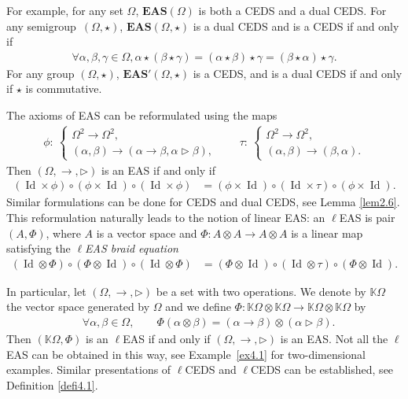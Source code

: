 \documentclass[pdftex]{sigma}
\numberwithin{equation}{section}
\newcommand{\eas}{\mathbf{EAS}}
\begin{document}
For example, for any set $\Omega$, $\eas(\Omega)$ is both a CEDS and a dual CEDS. For any semigroup~$(\Omega,\star)$, $\eas(\Omega,\star)$ is a dual CEDS and is a CEDS if and only if
\begin{align*}
\forall \alpha,\beta,\gamma \in \Omega,\alpha \star (\beta \star \gamma)=(\alpha \star \beta) \star \gamma=(\beta \star \alpha) \star \gamma.
\end{align*}
For any group $(\Omega,\star)$, $\eas'(\Omega,\star)$ is a CEDS, and is a dual CEDS if and only if $\star$ is commutative.

The axioms of EAS can be reformulated using the maps
\begin{gather*}
\phi\colon\ \begin{cases}
\Omega^2\longrightarrow\Omega^2,\\
(\alpha,\beta)\longrightarrow(\alpha \rightarrow \beta,\alpha \triangleright \beta),
\end{cases}\qquad
\tau\colon\ \begin{cases}
\Omega^2\longrightarrow\Omega^2,\\
(\alpha,\beta)\longrightarrow(\beta,\alpha).
\end{cases}
\end{gather*}
Then $(\Omega,\rightarrow,\triangleright)$ is an EAS if and only if
\begin{align*}
(\operatorname{Id} \times \phi)\circ (\phi\times \operatorname{Id})\circ (\operatorname{Id} \times \phi)&=(\phi \times \operatorname{Id})\circ (\operatorname{Id} \times \tau)\circ (\phi\times \operatorname{Id}).
\end{align*}
Similar formulations can be done for CEDS and dual CEDS, see Lemma \ref{lem2.6}.
This reformulation naturally leads to the notion of linear EAS: an $\ell$EAS is pair $(A,\Phi)$, where $A$ is a vector space and $\Phi\colon A\otimes A\longrightarrow A\otimes A$ is a linear map satisfying the \emph{$\ell$EAS braid equation}
\begin{align*}
(\operatorname{Id} \otimes \Phi)\circ (\Phi\otimes \operatorname{Id})\circ (\operatorname{Id} \otimes \Phi)&=(\Phi \otimes \operatorname{Id})\circ (\operatorname{Id} \otimes \tau)\circ (\Phi\otimes \operatorname{Id}).
\end{align*}

In particular, let $(\Omega,\rightarrow,\triangleright)$ be a set with two operations. We denote by $\mathbb{K}\Omega$ the vector space generated by $\Omega$ and we define $\Phi\colon\mathbb{K}\Omega\otimes \mathbb{K}\Omega\longrightarrow\mathbb{K}\Omega\otimes \mathbb{K}\Omega$ by
\begin{align*}
&\forall \alpha,\beta\in \Omega,\qquad\Phi(\alpha\otimes \beta)=(\alpha \rightarrow \beta)\otimes (\alpha \triangleright \beta).
\end{align*}
Then $(\mathbb{K}\Omega,\Phi)$ is an $\ell$EAS if and only if $(\Omega,\rightarrow,\triangleright)$ is an EAS.
Not all the $\ell$EAS can be obtained in this way, see Example~\ref{ex4.1} for two-dimensional examples. Similar presentations of $\ell$CEDS and $\ell$CEDS can be established, see Definition \ref{defi4.1}.
\end{document}
